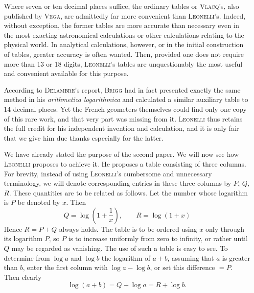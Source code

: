 Where seven or ten decimal places suffice, the ordinary tables or \textsc{Vlacq}'s, also published by \textsc{Vega}, are admittedly far more convenient than \textsc{Leonelli}'s. Indeed, without exception, the former tables are more accurate than necessary even in the most exacting astronomical calculations or other calculations relating to the physical world. In analytical calculations, however, or in the initial construction of tables, greater accuracy is often wanted. Then, provided one does not require more than 13 or 18 digits, \textsc{Leonelli}'s tables are unquestionably the most useful and convenient available for this purpose.

According to \textsc{Delambre}'s report, \textsc{Brigg} had in fact presented exactly the same method in his \emph{arithmetica logarithmica} and calculated a similar auxiliary table to 14 decimal places. Yet the French geometers themselves could find only one copy of this rare work, and that very part was missing from it. \textsc{Leonelli} thus retains the full credit for his independent invention and calculation, and it is only fair that we give him due thanks especially for the latter.

We have already stated the purpose of the second paper. We will now see how \textsc{Leonelli} proposes to achieve it. He proposes a table consisting of three columns. For brevity, instead of using \textsc{Leonelli}'s cumbersome and unnecessary terminology, we will denote corresponding entries in these three columns by $P$, $Q$, $R$. These quantities are to be related as follows. Let the number whose logarithm is $P$ be denoted by $x$. Then
\[
Q = \log\left(1+\frac{1}{x}\right), \qquad R = \log(1+x)
\]
Hence $R = P+Q$ always holds. The table is to be ordered using $x$ only through its logarithm $P$, so $P$ is to increase uniformly from zero to infinity, or rather until $Q$ may be regarded as vanishing. The use of such a table is easy to see. To determine from $\log a$ and $\log b$ the logarithm of $a+b$, assuming that $a$ is greater than $b$, enter the first column with $\log a - \log b$, or set this difference $= P$. Then clearly
\[
\log(a+b) = Q + \log a = R + \log b.
\]

